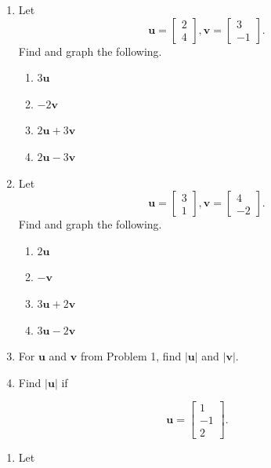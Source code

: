 \documentclass[
]{book}
\providecommand{\tightlist}{%
  \setlength{\itemsep}{0pt}\setlength{\parskip}{0pt}}
\theoremstyle{definition}
\theoremstyle{definition}
\theoremstyle{definition}
\theoremstyle{definition}
\theoremstyle{remark}
\begin{document}
\begin{enumerate}
\def\labelenumi{\arabic{enumi}.}
\item
  Let
  \[\mathbf{u}=\begin{bmatrix} 2\\4\end{bmatrix}, \mathbf{v}=\begin{bmatrix} 3\\-1\end{bmatrix}.\]
  Find and graph the following.

  \begin{enumerate}
  \def\labelenumii{\alph{enumii})}
  \tightlist
  \item
    \(3\mathbf{u}\)
  \item
    \(-2\mathbf{v}\)
  \item
    \(2\mathbf{u}+3\mathbf{v}\)
  \item
    \(2\mathbf{u}-3\mathbf{v}\)
  \end{enumerate}
\item
  Let
  \[\mathbf{u}=\begin{bmatrix} 3\\1\end{bmatrix}, \mathbf{v}=\begin{bmatrix} 4\\-2\end{bmatrix}.\]
  Find and graph the following.

  \begin{enumerate}
  \def\labelenumii{\alph{enumii})}
  \tightlist
  \item
    \(2\mathbf{u}\)
  \item
    \(-\mathbf{v}\)
  \item
    \(3\mathbf{u}+2\mathbf{v}\)
  \item
    \(3\mathbf{u}-2\mathbf{v}\)
  \end{enumerate}
\item
  For \(\mathbf{u}\) and \(\mathbf{v}\) from Problem 1, find \(|\mathbf{u}|\) and \(|\mathbf{v}|.\)
\item
  Find \(|\mathbf{u}|\) if
\end{enumerate}

\[\mathbf{u}=\begin{bmatrix} 1\\-1\\2\end{bmatrix}.\]

\begin{enumerate}
\def\labelenumi{\arabic{enumi}.}
\setcounter{enumi}{4}
\tightlist
\item
  Let
\end{enumerate}
\end{document}
